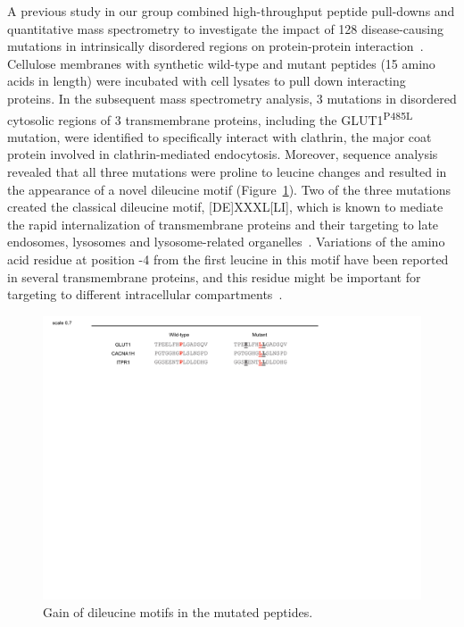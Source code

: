 A previous study in our group combined high-throughput peptide pull-downs and quantitative mass spectrometry to investigate the impact of 128 disease-causing mutations in intrinsically disordered regions on protein-protein interaction~\cite{Meyer2}. Cellulose membranes with synthetic wild-type and mutant peptides (15 amino acids in length) were incubated with cell lysates to pull down interacting proteins. In the subsequent mass spectrometry analysis, 3 mutations in disordered cytosolic regions of 3 transmembrane proteins, including the GLUT1\textsuperscript{P485L} mutation, were identified to specifically interact with clathrin, the major coat protein involved in clathrin-mediated endocytosis. Moreover, sequence analysis revealed that all three mutations were proline to leucine changes and resulted in the appearance of a novel dileucine motif (Figure~\ref{fig:motif}). Two of the three mutations created the classical dileucine motif, [DE]XXXL[LI], which is known to mediate the rapid internalization of transmembrane proteins and their targeting to late endosomes, lysosomes and lysosome-related organelles~\cite{Bonifacino}. Variations of the amino acid residue at position -4 from the first leucine in this motif have been reported in several transmembrane proteins, and this residue might be important for targeting to different intracellular compartments~\cite{Bonifacino,Sandoval}.
\begin{figure}[h]
\centering
\includegraphics[scale=0.7]{Figures/motif}
\caption{Gain of dileucine motifs in the mutated peptides.}
\label{fig:motif}
\end{figure}

